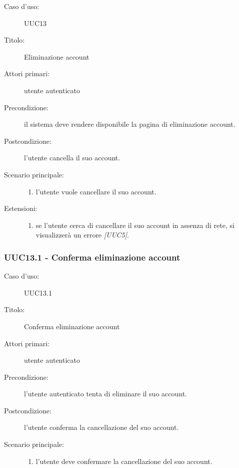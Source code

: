 \documentclass[../analisi-dei-requisiti.tex]{subfiles}
\begin{document}
\begin{description}
  \item[Caso d’uso:] UUC13
  \item[Titolo:] Eliminazione account
  \item[Attori primari:] utente autenticato
  \item[Precondizione:] il sistema deve rendere disponibile la pagina di eliminazione account.
  \item[Postcondizione:] l'utente cancella il suo account.
  \item[Scenario principale:]
        \begin{enumerate}
          \item l'utente vuole cancellare il suo account.
        \end{enumerate}
        \item[Estensioni:]
        \begin{enumerate}
          \item se l'utente cerca di cancellare il suo account in assenza di rete, si visualizzerà un errore \emph{[UUC5]}.
        \end{enumerate}
\end{description}

\subsubsection{UUC13.1 - Conferma eliminazione account}%
\label{subsub:UUC13.1utente}

\begin{description}
  \item[Caso d’uso:] UUC13.1
  \item[Titolo:] Conferma eliminazione account
  \item[Attori primari:] utente autenticato
  \item[Precondizione:] l'utente autenticato tenta di eliminare il suo account.
  \item[Postcondizione:] l'utente conferma la cancellazione del suo account.
  \item[Scenario principale:]
        \begin{enumerate}
          \item l'utente deve confermare la cancellazione del suo account.
        \end{enumerate}
\end{description}
\end{document}
